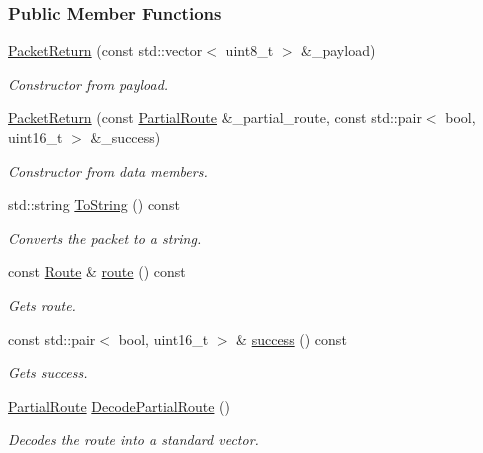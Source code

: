 \subsubsection*{Public Member Functions}
\begin{DoxyCompactItemize}
\item 
\hyperlink{classosse_1_1collaborate_1_1_packet_return_a09a26d47a8b30c5f7002ca8e4b8bb89a}{Packet\+Return} (const std\+::vector$<$ uint8\+\_\+t $>$ \&\+\_\+payload)
\begin{DoxyCompactList}\small\item\em Constructor from payload. \end{DoxyCompactList}\item 
\hyperlink{classosse_1_1collaborate_1_1_packet_return_aa98e41d208d00cd972125b63f5fcf8b5}{Packet\+Return} (const \hyperlink{classosse_1_1collaborate_1_1_packet_return_a56d5b319f0625cdabbfc4f6cbd01b002}{Partial\+Route} \&\+\_\+partial\+\_\+route, const std\+::pair$<$ bool, uint16\+\_\+t $>$ \&\+\_\+success)
\begin{DoxyCompactList}\small\item\em Constructor from data members. \end{DoxyCompactList}\item 
std\+::string \hyperlink{classosse_1_1collaborate_1_1_packet_return_a415e0fd114b2460f62a6800023dafc0a}{To\+String} () const
\begin{DoxyCompactList}\small\item\em Converts the packet to a string. \end{DoxyCompactList}\item 
const \hyperlink{classosse_1_1collaborate_1_1_packet_return_a1c00d25b9e8d526be915c28b8ee0ba3b}{Route} \& \hyperlink{classosse_1_1collaborate_1_1_packet_return_a7022bd230981dc2b8424b3ff180f9ef4}{route} () const
\begin{DoxyCompactList}\small\item\em Gets route. \end{DoxyCompactList}\item 
const std\+::pair$<$ bool, uint16\+\_\+t $>$ \& \hyperlink{classosse_1_1collaborate_1_1_packet_return_ac6b2ab10694bac5f89cf829e34742345}{success} () const
\begin{DoxyCompactList}\small\item\em Gets success. \end{DoxyCompactList}\item 
\hyperlink{classosse_1_1collaborate_1_1_packet_return_a56d5b319f0625cdabbfc4f6cbd01b002}{Partial\+Route} \hyperlink{classosse_1_1collaborate_1_1_packet_return_a2534afa0446ef8f4dbe9c051607e55d7}{Decode\+Partial\+Route} ()
\begin{DoxyCompactList}\small\item\em Decodes the route into a standard vector. \end{DoxyCompactList}\end{DoxyCompactItemize}
